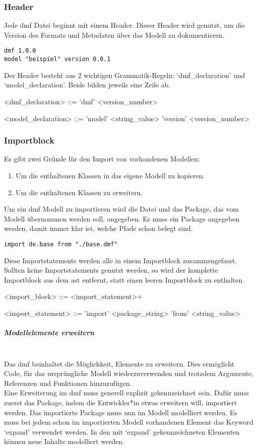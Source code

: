 \documentclass[./einleitung.tex]{subfiles}
\begin{document}
\subsubsection{Header}
Jede \acrshort{dmf} Datei beginnt mit einem Header.
Dieser Header wird genutzt, um die Version des Formats und Metadaten über das Modell zu dokumentieren.
\begin{lstlisting}[caption={Header einer \acrshort{dmf}-Modelldatei}]
dmf 1.0.0
model "beispiel" version 0.0.1
\end{lstlisting}
Der Header besteht aus 2 wichtigen Grammatik-Regeln: `dmf_declaration' und `model_declaration'.
Beide bilden jeweils eine Zeile ab.

\begin{grammar}
<dmf_declaration> ::= 'dmf' <version_number>

<model_declaration> ::= 'model' <string_value> 'version' <version_number>
\end{grammar}

\subsubsection{Importblock}
Es gibt zwei Gründe für den Import von vorhandenen Modellen:
\begin{enumerate}
\item Um die enthaltenen Klassen in das eigene Modell zu kopieren.
\item Um die enthaltenen Klassen zu erweitern.
\end{enumerate}
Um ein \acrshort{dmf} Modell zu importieren wird die Datei und das Package, das vom Modell übernommen werden soll, angegeben.
Es muss ein Package angegeben werden, damit immer klar ist, welche Pfade schon belegt sind.
\begin{lstlisting}[caption={Import des Package de.base}]
import de.base from "./base.dmf"
\end{lstlisting}
Diese Importstatements werden alle in einem Importblock zusammengefasst.
Sollten keine Importstatements genutzt werden, so wird der komplette Importblock aus dem \acrshort{ast} entfernt, statt einen leeren Importblock zu enthalten.
\begin{grammar}
<import_block> ::= <import_statement>+

<import_statement> ::= 'import' <package_string> 'from' <string_value>
\end{grammar}

\subparagraph{Modellelemente erweitern}\mbox{}\\
Das \acrshort{dmf} beinhaltet die Möglichkeit, Elemente zu erweitern.
Dies ermöglicht Code, für das ursprüngliche Modell wiederzuverwenden und trotzdem Argumente, Referenzen und Funktionen hinzuzufügen. \\
Eine Erweiterung im \acrshort{dmf} muss generell explizit gekennzeichnet sein.
Dafür muss zuerst das Package, indem die Entwickler*in etwas erweitern will, importiert werden.
Das importierte Package muss nun im Modell modelliert werden.
Es muss bei jedem schon im importierten Modell vorhandenen Element das Keyword `expand' verwendet werden.
In den mit `expand' gekennzeichneten Elementen können neue Inhalte modelliert werden.
\end{document}
